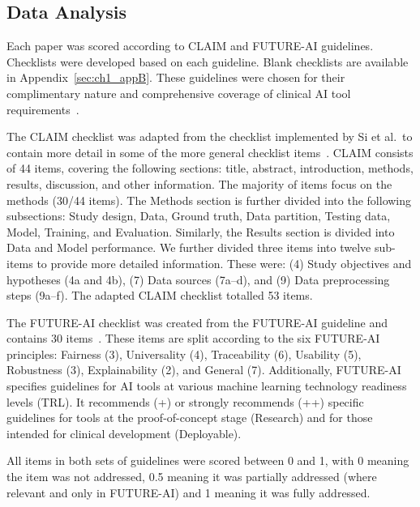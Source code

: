 \subsection{Data Analysis}
Each paper was scored according to CLAIM and FUTURE-AI guidelines.
Checklists were developed based on each guideline.
Blank checklists are available in Appendix~\ref{sec:ch1_appB}.
These guidelines were chosen for their complimentary nature and comprehensive coverage of clinical AI tool requirements~\autocite{klontzas2023}.

The CLAIM checklist was adapted from the checklist implemented by Si et al.\ to contain more detail in some of the more general checklist items~\autocite{tejani2024,si2022,mongan2020}.
CLAIM consists of 44 items, covering the following sections: title, abstract, introduction, methods, results, discussion, and other information.
The majority of items focus on the methods (30/44 items).
The Methods section is further divided into the following subsections: Study design, Data, Ground truth, Data partition, Testing data, Model, Training, and Evaluation.
Similarly, the Results section is divided into Data and Model performance.
We further divided three items into twelve sub-items to provide more detailed information.
These were: (4) Study objectives and hypotheses (4a and 4b), (7) Data sources (7a--d), and (9) Data preprocessing steps (9a--f).
The adapted CLAIM checklist totalled 53 items.

The FUTURE-AI checklist was created from the FUTURE-AI guideline and contains 30 items~\autocite{lekadir2025}.
These items are split according to the six FUTURE-AI principles: Fairness (3), Universality (4), Traceability (6), Usability (5), Robustness (3), Explainability (2), and General (7).
Additionally, FUTURE-AI specifies guidelines for AI tools at various machine learning technology readiness levels (TRL).
It recommends (+) or strongly recommends (++) specific guidelines for tools at the proof-of-concept stage (Research) and for those intended for clinical development (Deployable).

All items in both sets of guidelines were scored between 0 and 1, with 0 meaning the item was not addressed, 0.5 meaning it was partially addressed (where relevant and only in FUTURE-AI) and 1 meaning it was fully addressed.

